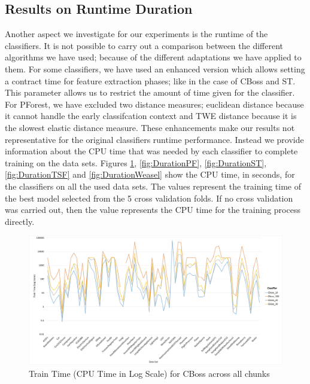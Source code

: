 \subsection{Results on Runtime Duration}
\label{SubsectionRuntime}
Another aspect we investigate for our experiments is the runtime of the classifiers.
It is not possible to carry out a comparison between the different algorithms we have used; because of the different adaptations we have applied to them.
For some classifiers, we have used an enhanced version which allows setting a contract time for feature extraction phases; like in the case of CBoss and ST.
This parameter allows us to restrict the amount of time given for the classifier.
For PForest, we have excluded two distance measures; euclidean distance because it cannot handle the early classifcation context
and TWE distance because it is the slowest elastic distance measure.
These enhancements make our results not representative for the original classifiers runtime performance.
Instead we provide information about the CPU time that was needed by each classifier to complete training on the data sets.
Figures \ref{fig:DurationCBoss}, \ref{fig:DurationPF}, \ref{fig:DurationST}, \ref{fig:DurationTSF} and \ref{fig:DurationWeasel} show the CPU time, in seconds, for the classifiers on all the used data sets.
The values represent the training time of the best model selected from the 5 cross validation folds.
If no cross validation was carried out, then the value represents the CPU time for the training process directly.

\begin{figure} [!htb]
  \centering
  \includegraphics[width=\textwidth]{Duration_cboss.jpg}
  \caption{Train Time (CPU Time in Log Scale) for CBoss across all chunks}
  \label{fig:DurationCBoss}
\end{figure}

